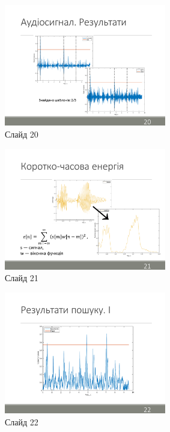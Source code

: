 \documentclass[pdftex]{thesis_utf8}
\begin{document}
\begin{figure}[h]
    \centering
    \includegraphics[width=0.63\textwidth]{slides/slide20.png}
    \caption{Слайд 20}
\end{figure}
\clearpage

\begin{figure}[h]
    \centering
    \includegraphics[width=0.63\textwidth]{slides/slide21.png}
    \caption{Слайд 21}
\end{figure}

\begin{figure}[h]
    \centering
    \includegraphics[width=0.63\textwidth]{slides/slide22.png}
    \caption{Слайд 22}
\end{figure}
\clearpage
\end{document}
